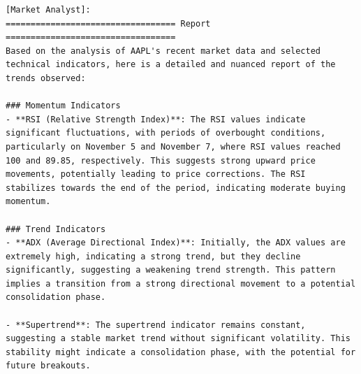 

\begin{tcolorbox}[
    breakable,
    enhanced,
    colback=lightmint!70!white,
    colframe=teal!20!gray,
    coltitle=black,
    boxrule=0.5pt,
    arc=0.5mm,
    top=2mm, bottom=2mm, left=2mm, right=2mm,
    fonttitle=\usefont{T1}{ppl}{b}{n},
    title=\model: Market Analyst Team -- Apple (AAPL),
]
\footnotesize
\begin{lstlisting}[style=agentbase]
[Market Analyst]:
================================== Report ==================================
Based on the analysis of AAPL's recent market data and selected technical indicators, here is a detailed and nuanced report of the trends observed:

### Momentum Indicators
- **RSI (Relative Strength Index)**: The RSI values indicate significant fluctuations, with periods of overbought conditions, particularly on November 5 and November 7, where RSI values reached 100 and 89.85, respectively. This suggests strong upward price movements, potentially leading to price corrections. The RSI stabilizes towards the end of the period, indicating moderate buying momentum.

### Trend Indicators
- **ADX (Average Directional Index)**: Initially, the ADX values are extremely high, indicating a strong trend, but they decline significantly, suggesting a weakening trend strength. This pattern implies a transition from a strong directional movement to a potential consolidation phase.

- **Supertrend**: The supertrend indicator remains constant, suggesting a stable market trend without significant volatility. This stability might indicate a consolidation phase, with the potential for future breakouts.


\end{lstlisting}
\end{tcolorbox}
